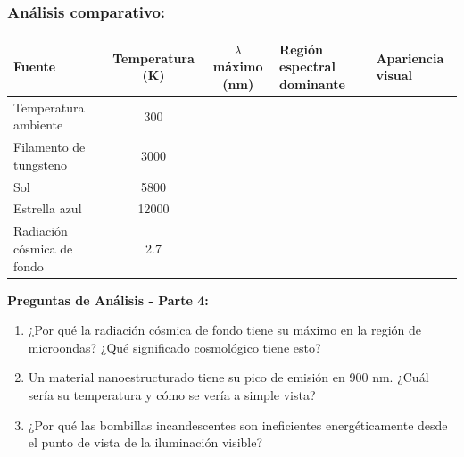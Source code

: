 \documentclass[12pt,a4paper]{article}
\begin{document}
	\subsubsection{Análisis comparativo:}
	
	\begin{center}
		\begin{tabular}{|p{3cm}|c|c|p{3.5cm}|p{2.5cm}|}
			\hline
			\textbf{Fuente} & \textbf{Temperatura (K)} & \textbf{$\lambda$ máximo (nm)} & \textbf{Región espectral dominante} & \textbf{Apariencia visual} \\
			\hline
			Temperatura ambiente & 300 & & & \\
			\hline
			Filamento de tungsteno & 3000 & & & \\
			\hline
			Sol & 5800 & & & \\
			\hline
			Estrella azul & 12000 & & & \\
			\hline
			Radiación cósmica de fondo & 2.7 & & & \\
			\hline
		\end{tabular}
	\end{center}
	
	\begin{preguntabox}
		\textbf{Preguntas de Análisis - Parte 4:}
		\begin{enumerate}
			\item ¿Por qué la radiación cósmica de fondo tiene su máximo en la región de microondas? ¿Qué significado cosmológico tiene esto?
			
			\vspace{1.5cm}
			
			\item Un material nanoestructurado tiene su pico de emisión en 900 nm. ¿Cuál sería su temperatura y cómo se vería a simple vista?
			
			\vspace{1.5cm}
			
			\item ¿Por qué las bombillas incandescentes son ineficientes energéticamente desde el punto de vista de la iluminación visible?
			
			\vspace{1.5cm}
		\end{enumerate}
	\end{preguntabox}
	
	
\end{document}
